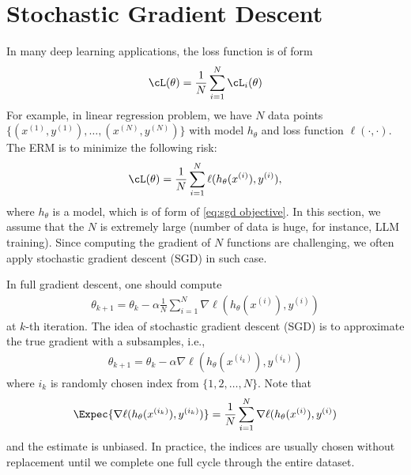 \documentclass{article}
\begin{document}
\section{Stochastic Gradient Descent}
In many deep learning applications, the loss function is of form
\begin{align}
    \cL(\theta) = \frac{1}{N}\sum_{i=1}^N \cL_i(\theta) \label{eq:sgd objective}
\end{align}
For example, in linear regression problem,
we have $N$ data points $\{(x^{(1)}, y^{(1)}), \dots , (x^{(N)}, y^{(N)})\}$ 
with model $h_\theta$ and loss function $\ell(\cdot, \cdot)$.
The ERM is to minimize the following risk:
\begin{align}
    \cL(\theta) =    \frac{1}{N} \sum_{i=1}^N \ell(h_{\theta}(x^{(i)}), y^{(i)}),
\end{align}
where $h_\theta$ is a model, which is of form of \eqref{eq:sgd objective}.
In this section, we assume that the $N$ is extremely large 
(number of data is huge, for instance, LLM training).
Since computing the gradient of $N$ functions are challenging,
we often apply stochastic gradient descent (SGD) in such case.

In full gradient descent, one should compute
\begin{align}
    \theta_{k+1} =
    \theta_k - \alpha \frac{1}{N}\sum_{i=1}^N \nabla \ell(h_\theta(x^{(i)}), y^{(i)})
\end{align}
at $k$-th iteration.
The idea of stochastic gradient descent (SGD) is to approximate the true gradient
with a subsamples, i.e.,
\begin{align}
    \theta_{k+1} = \theta_k - \alpha  \nabla \ell(h_\theta(x^{(i_k)}), y^{(i_k)})
\end{align}
where $i_k$ is randomly chosen index from $\{1, 2, \dots, N\}$.
Note that 
\begin{align}
  \Expec{  \nabla \ell(h_\theta(x^{(i_k)}), y^{(i_k)})} = 
  \frac{1}{N}\sum_{i=1}^N \nabla \ell(h_\theta(x^{(i)}), y^{(i)})
\end{align}
and the estimate is unbiased.
In practice, the indices are usually chosen without replacement until we complete one full
cycle through the entire dataset.


\end{document}
